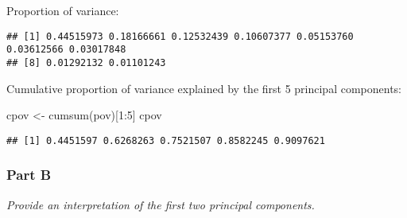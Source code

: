 \documentclass[
]{article}
\newenvironment{Shaded}{\begin{snugshade}}{\end{snugshade}}
\newcommand{\DecValTok}[1]{\textcolor[rgb]{0.00,0.00,0.81}{#1}}
\newcommand{\FunctionTok}[1]{\textcolor[rgb]{0.00,0.00,0.00}{#1}}
\newcommand{\NormalTok}[1]{#1}
\newcommand{\OtherTok}[1]{\textcolor[rgb]{0.56,0.35,0.01}{#1}}
\newcommand{\SpecialCharTok}[1]{\textcolor[rgb]{0.00,0.00,0.00}{#1}}
\begin{document}
Proportion of variance:

\begin{Shaded}
\end{Shaded}

\begin{verbatim}
## [1] 0.44515973 0.18166661 0.12532439 0.10607377 0.05153760 0.03612566 0.03017848
## [8] 0.01292132 0.01101243
\end{verbatim}

Cumulative proportion of variance explained by the first 5 principal
components:

\begin{Shaded}
\begin{Highlighting}[]
\NormalTok{cpov }\OtherTok{\textless{}{-}} \FunctionTok{cumsum}\NormalTok{(pov)[}\DecValTok{1}\SpecialCharTok{:}\DecValTok{5}\NormalTok{]}
\NormalTok{cpov}
\end{Highlighting}
\end{Shaded}

\begin{verbatim}
## [1] 0.4451597 0.6268263 0.7521507 0.8582245 0.9097621
\end{verbatim}

\hypertarget{part-b-4}{%
\subsubsection{Part B}\label{part-b-4}}

\emph{Provide an interpretation of the first two principal components.}

\begin{Shaded}
\end{Shaded}
\end{document}
